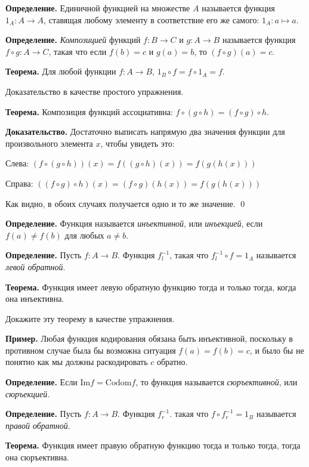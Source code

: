 {\bfseries Определение.} Единичной функцией на множестве $A$ называется функция $1_A: A\to A$, ставящая любому элементу в соответствие его же самого: $1_A: a\mapsto a$.

{\bfseries Определение.} {\slshape Композицией} функций $f:B\to C$ и $g:A\to B$ называется функция $f\circ g: A\to C$, такая что если $f(b) = c$ и $g(a) = b$, то $(f\circ g)(a) = c$.

{\bfseries Теорема.} Для любой функции $f: A\to B$, $1_B \circ f = f \circ 1_A = f$.

Доказательство в качестве простого упражнения.

{\bfseries Теорема.} Композиция функций ассоциативна: $f\circ (g \circ h) = (f\circ g)\circ h$.

{\bfseries Доказательство.} Достаточно выписать напрямую два значения функции для произвольного элемента $x$, чтобы увидеть это:

Слева: $(f\circ (g \circ h)) (x) = f((g\circ h)(x)) = f(g(h(x)))$

Справа: $((f\circ g) \circ h) (x) = (f\circ g)(h(x)) = f(g(h(x)))$

Как видно, в обоих случаях получается одно и то же значение. \qed

{\bfseries Определение.} Функция называется {\slshape инъективной}, или {\slshape инъекцией}, если $f(a)\not= f(b)$ для любых $a\not= b$.

{\bfseries Определение.} Пусть $f:A\to B$. Функция $f^{-1}_l$, такая что $f^{-1}_l\circ f = 1_A$ называется {\slshape левой обратной}.

{\bfseries Теорема.} Функция имеет левую обратную функцию тогда и только тогда, когда она инъективна.

Докажите эту теорему в качестве упражнения.

{\bfseries Пример.} Любая функция кодирования обязана быть инъективной, поскольку в противном случае была бы возможна ситуация $f(a) = f(b) = c$, и было бы не понятно как мы должны раскодировать $c$ обратно.

{\bfseries Определение.} Если $\mathrm{Im}f = \mathrm{Codom}f$, то функция называется {\slshape сюръективной}, или {\slshape сюръекцией.}

{\bfseries Определение.} Пусть $f: A\to B$. Функция $f^{-1}_r$. такая что $f\circ f^{-1}_r = 1_B$ называется {\slshape правой обратной}.

{\bfseries Теорема.} Функция имеет правую обратную функцию тогда и только тогда, тогда она сюръективна.

